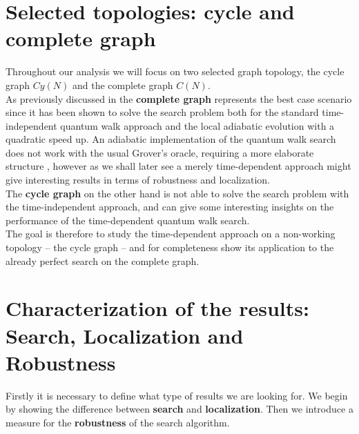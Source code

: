 \clearpage
\section{Selected topologies: cycle and complete graph}
    Throughout our analysis we will focus on two selected graph topology, the cycle graph $Cy(N)$ and the complete graph $C(N)$. \\

    As previously discussed in  the \textbf{complete graph} represents the best case scenario since it has been shown to solve the search problem both for the standard time-independent quantum walk approach \cite{Childs2004} and the local adiabatic evolution \cite{Roland2002} with a quadratic speed up. An adiabatic implementation of the quantum walk search does not work with the usual Grover's oracle, requiring a more elaborate structure \cite{Wong2016}, however as we shall later see a merely time-dependent approach might give interesting results in terms of robustness and localization.  \\

    The \textbf{cycle graph} on the other hand is not able to solve the search problem with the time-independent approach, and can give some interesting insights on the performance of the time-dependent quantum walk search.  \\

    The goal is therefore to study the time-dependent approach on a non-working topology -- the cycle graph -- and for completeness show its application to the already perfect search on the complete graph.

\section[Search, localization and robustness]{Characterization of the results: Search, Localization and Robustness}
    Firstly it is necessary to define what type of results we are looking for. We begin by showing the difference between \textbf{search} and \textbf{localization}. Then we introduce a measure for the \textbf{robustness} of the search algorithm.

